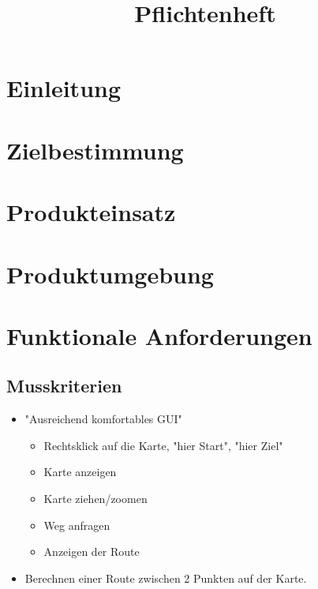 \documentclass[a4paper, 11pt]{article}
\title{Pflichtenheft}
\begin{document}

\maketitle
\newpage
\tableofcontents
\newpage


\section{Einleitung}

\section{Zielbestimmung}

\section{Produkteinsatz}

\section{Produktumgebung}

\section{Funktionale Anforderungen}

\subsection{Musskriterien}
\begin{itemize}
\item "Ausreichend komfortables GUI"
\begin{itemize}
\item Rechtsklick auf die Karte, "hier Start", "hier Ziel"
\item Karte anzeigen
\item Karte ziehen/zoomen
\item Weg anfragen
\item Anzeigen der Route
\end{itemize}
\item Berechnen einer Route zwischen 2 Punkten auf der Karte.
\end{itemize}
\end{document}
